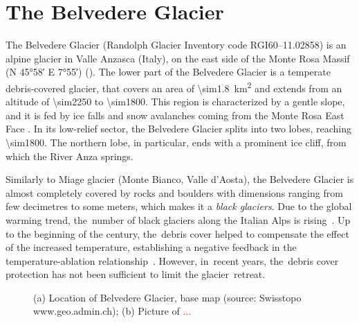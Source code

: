 
\section{The Belvedere Glacier}\label{sec:1:belvedereglacier}

The Belvedere Glacier (Randolph Glacier Inventory code RGI60--11.02858) is an alpine
glacier in Valle Anzasca (Italy), on the east side of the Monte Rosa Massif (N
\ang{45;58} E \ang{7;55}) ().
The lower part of the Belvedere Glacier is a temperate debris-covered glacier, that
covers an area of
\SI{\sim1.8}{\kilo\meter\squared} and extends from an altitude of \SI{\sim2250}{\masl} to
\SI{\sim1800}{\masl}.
This region is characterized by a gentle slope, and it is fed by ice falls and snow
avalanches coming from the Monte Rosa East Face \citep{Haeberli2002}. In its low-relief
sector, the Belvedere Glacier splits into two lobes, reaching \SI{\sim1800}{\masl}.
The northern lobe, in particular, ends with a prominent ice cliff, from which the River
Anza springs.

Similarly to Miage glacier (Monte Bianco, Valle d’Aosta), the Belvedere Glacier is almost
completely covered by rocks and boulders with dimensions ranging from few decimetres to
some meters, which makes it a \textit{black glaciers}.
Due to the global warming trend, the~number of black glaciers along the Italian Alps is
rising~\citep{Diolaiuti2003}.
Up to the beginning of the century, the~debris cover helped to compensate the effect of
the increased temperature, establishing a negative feedback in the temperature-ablation
relationship~\citep{Roethlisberger1985,Diolaiuti2003}.
However, in~recent years, the~debris cover protection has not been sufficient to limit
the glacier~retreat.

\begin{figure}
    \centering
    \caption{(a) Location of Belvedere Glacier, base map (source: Swisstopo
        www.geo.admin.ch); (b) Picture of \textcolor{red}{...}}
    \label{fig:1:studyarea}
\end{figure}


